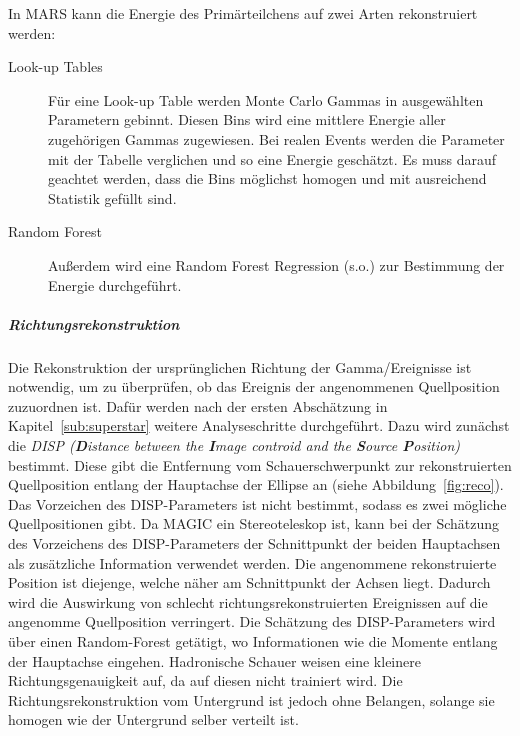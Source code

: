 In MARS kann die Energie des Primärteilchens auf zwei Arten rekonstruiert werden:
\begin{description}
	\item[\quad Look-up Tables] Für eine Look-up Table werden Monte Carlo
		Gammas in ausgewählten Parametern gebinnt.
		Diesen Bins wird eine mittlere Energie aller
		zugehörigen Gammas zugewiesen.
		Bei realen Events werden die Parameter mit der Tabelle verglichen
		und so eine Energie geschätzt.
		Es muss darauf geachtet werden,
		dass die Bins möglichst homogen und mit ausreichend Statistik gefüllt sind.
	\item[\quad Random Forest] Außerdem wird eine Random Forest Regression (s.o.)
		zur Bestimmung der Energie durchgeführt.
\end{description}

\subparagraph{Richtungsrekonstruktion}%
\label{par:position}

Die Rekonstruktion der ursprünglichen Richtung der Gamma\-/Ereignisse
ist notwendig, um zu überprüfen, ob das Ereignis der angenommenen
Quellposition zuzuordnen ist.
Dafür werden nach der ersten Abschätzung in Kapitel~\ref{sub:superstar} weitere
Analyseschritte durchgeführt.
Dazu wird zunächst die \textit{DISP (\textbf{D}istance between the
\textbf{I}mage controid and the \textbf{S}ource \textbf{P}osition)} bestimmt.
Diese gibt die Entfernung vom Schauerschwerpunkt zur rekonstruierten Quellposition
entlang der Hauptachse der Ellipse an (siehe Abbildung~\ref{fig:reco}).
Das Vorzeichen des DISP-Parameters ist nicht bestimmt,
sodass es zwei mögliche Quellpositionen gibt.
Da MAGIC ein Stereoteleskop ist,
kann bei der Schätzung des Vorzeichens des DISP-Parameters
der Schnittpunkt der beiden Hauptachsen als zusätzliche Information
verwendet werden.
Die angenommene rekonstruierte Position ist diejenge, welche näher am
Schnittpunkt der Achsen liegt.
Dadurch wird die Auswirkung von schlecht richtungsrekonstruierten Ereignissen
auf die angenomme Quellposition verringert.
Die Schätzung des DISP-Parameters wird über einen Random-Forest getätigt,
wo Informationen wie die Momente entlang der Hauptachse eingehen.
Hadronische Schauer weisen eine kleinere Richtungsgenauigkeit auf, da auf diesen
nicht trainiert wird.
Die Richtungsrekonstruktion vom Untergrund ist jedoch ohne Belangen, solange sie
homogen wie der Untergrund selber verteilt ist.



